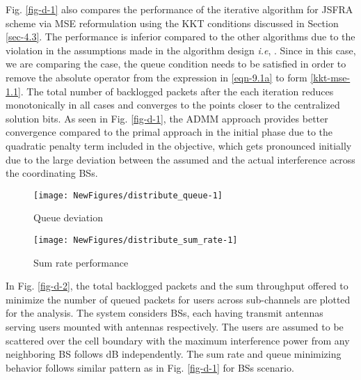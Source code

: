 Fig. \ref{fig-d-1} also compares the performance of the iterative algorithm for \ac{JSFRA} scheme via \ac{MSE} reformulation using the \ac{KKT} conditions discussed in Section \ref{sec-4.3}. The performance is inferior compared to the other algorithms due to the violation in the assumptions made in the algorithm design \textit{i.e}, . Since in this case, we are comparing the  case, the queue condition  needs to be satisfied in order to remove the absolute operator from the expression in \eqref{eqn-9.1a} to form \eqref{kkt-mse-1.1}. The total number of backlogged packets after the each iteration reduces monotonically in all cases and converges to the points closer to the centralized solution  bits. As seen in Fig. \ref{fig-d-1}, the \ac{ADMM} approach provides better convergence compared to the primal approach in the initial phase due to the quadratic penalty term included in the objective, which gets pronounced initially due to the large deviation between the assumed and the actual interference across the coordinating \acp{BS}.
\begin{figure*}
\centering
\begin{subfigure}{0.49\textwidth}
\texttt{[image: NewFigures/distribute\_queue-1]}
\caption{Queue deviation}
\label{fig-d-1.1}
\end{subfigure}
\hfill
\begin{subfigure}{0.49\textwidth}
\texttt{[image: NewFigures/distribute\_sum\_rate-1]}
\caption{Sum rate performance}
\label{fig-d-1.2}
\end{subfigure}
\caption[short]{Convergence plot for  model}
\label{fig-d-1}
\end{figure*}

In Fig. \ref{fig-d-2}, the total backlogged packets and the sum throughput offered to minimize the number of queued packets for  users across  sub-channels are plotted for the analysis. The system considers  \acp{BS}, each having  transmit antennas serving  users mounted with  antennas respectively. The users are assumed to be scattered over the cell boundary with the maximum interference power from any neighboring \ac{BS} follows  dB independently. The sum rate and queue minimizing behavior follows similar pattern as in Fig. \ref{fig-d-1} for  \acp{BS} scenario.

